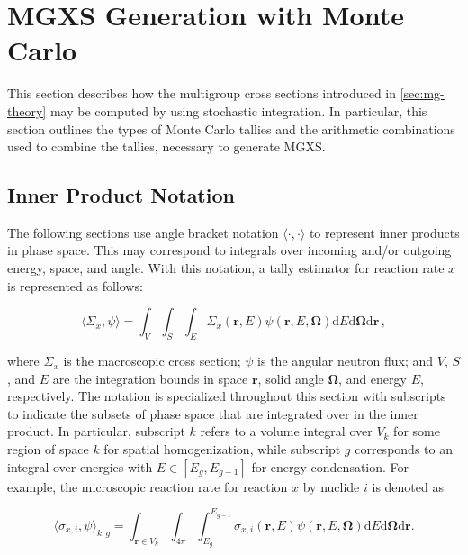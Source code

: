 \section{MGXS Generation with Monte Carlo}
\label{sec:mgxs-mc}

This section describes how the multigroup cross sections introduced in \cref{sec:mg-theory} may be computed by using stochastic integration. In particular, this section outlines the types of Monte Carlo tallies and the arithmetic combinations used to combine the tallies, necessary to generate MGXS.

\subsection{Inner Product Notation}
\label{subsubsec:tally-types-notation}

The following sections use angle bracket notation $\langle \cdot , \cdot \rangle$ to represent inner products in phase space. This may correspond to integrals over incoming and/or outgoing energy, space, and angle. With this notation, a tally estimator for reaction rate $x$ is represented as follows:

\begin{equation}
\label{eqn:inner-prod}
\langle \Sigma_x, \psi \rangle = \int_{V} \int_{S} \int_{E} \Sigma_{x}(\mathbf{r},E)\psi(\mathbf{r},E,\mathbf{\Omega}) \mathrm{d}E\mathrm{d}\mathbf{\Omega}\mathrm{d}\mathbf{r}\,,
\end{equation}

\noindent where $\Sigma_x$ is the macroscopic cross section; $\psi$ is the angular neutron flux; and $V$, $S$, and $E$ are the integration bounds in space $\mathbf{r}$, solid angle $\mathbf{\Omega}$, and energy $E$, respectively. The notation is specialized throughout this section with subscripts to indicate the subsets of phase space that are integrated over in the inner product. In particular, subscript $k$ refers to a volume integral over $V_{k}$ for some region of space $k$ for spatial homogenization, while subscript $g$ corresponds to an integral over energies with $E \in [E_{g}, E_{g-1}]$ for energy condensation. For example, the microscopic reaction rate for reaction $x$ by nuclide $i$ is denoted as

\begin{equation}
\label{eqn:angle-rxn-rate}
\langle \sigma_{x,i}, \psi \rangle_{k,g} = \int_{\mathbf{r} \in V_{k}} \int_{4\pi} \int_{E_{g}}^{E_{g-1}} \sigma_{x,i}(\mathbf{r},E)\psi(\mathbf{r},E,\mathbf{\Omega}) \mathrm{d}E\mathrm{d}\mathbf{\Omega}\mathrm{d}\mathbf{r}.
\end{equation}


